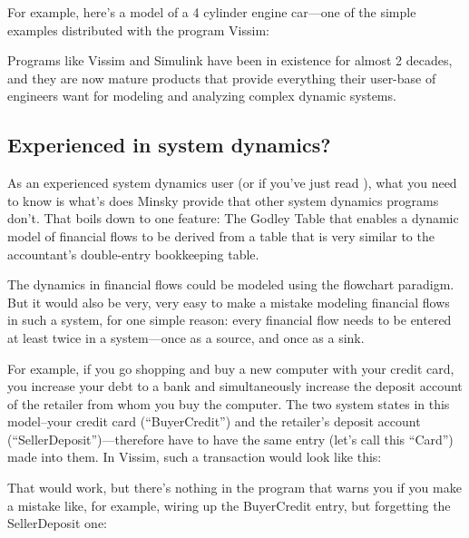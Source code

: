 For example, here's a model of a 4 cylinder engine car---one of the
simple examples distributed with the program Vissim:

\begin{center}
\end{center}

Programs like Vissim and Simulink have been in existence for almost 2
decades, and they are now mature products that provide everything
their user-base of engineers want for modeling and analyzing complex
dynamic systems. 

\subsection{Experienced in system dynamics?}
\label{intro:experienced}

As an experienced system dynamics user (or if you've just read ), what you need to know is what's does Minsky
provide that other system dynamics programs don't. That boils down to
one feature: The Godley Table that enables a dynamic model of
financial flows to be derived from a table that is very similar to the
accountant's double-entry bookkeeping table.


The dynamics in financial flows could be modeled using the flowchart
paradigm. But it would also be very, very easy to make a mistake
modeling financial flows in such a system, for one simple reason:
every financial flow needs to be entered at least twice in a
system---once as a source, and once as a sink.


For example, if you go shopping and buy a new computer with your
credit card, you increase your debt to a bank and simultaneously
increase the deposit account of the retailer from whom you buy the
computer. The two system states in this model--your credit card
(``BuyerCredit'') and the retailer's deposit account
(``SellerDeposit'')---therefore have to have the same entry (let's call
this ``Card'') made into them. In Vissim, such a transaction would look
like this:


\begin{center}
\end{center}

That would work, but there's nothing in the program that warns you if
you make a mistake like, for example, wiring up the BuyerCredit entry,
but forgetting the SellerDeposit one:

